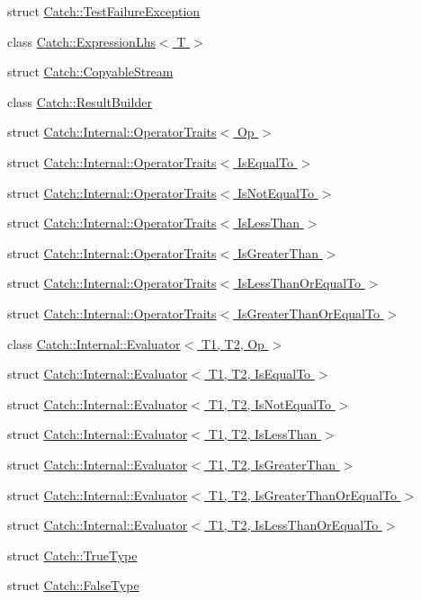 \begin{DoxyCompactItemize}
\item 
struct \hyperlink{a00087}{Catch\+::\+Test\+Failure\+Exception}
\item 
class \hyperlink{a00028}{Catch\+::\+Expression\+Lhs$<$ T $>$}
\item 
struct \hyperlink{a00014}{Catch\+::\+Copyable\+Stream}
\item 
class \hyperlink{a00067}{Catch\+::\+Result\+Builder}
\item 
struct \hyperlink{a00056}{Catch\+::\+Internal\+::\+Operator\+Traits$<$ Op $>$}
\item 
struct \hyperlink{a00057}{Catch\+::\+Internal\+::\+Operator\+Traits$<$ Is\+Equal\+To $>$}
\item 
struct \hyperlink{a00062}{Catch\+::\+Internal\+::\+Operator\+Traits$<$ Is\+Not\+Equal\+To $>$}
\item 
struct \hyperlink{a00060}{Catch\+::\+Internal\+::\+Operator\+Traits$<$ Is\+Less\+Than $>$}
\item 
struct \hyperlink{a00058}{Catch\+::\+Internal\+::\+Operator\+Traits$<$ Is\+Greater\+Than $>$}
\item 
struct \hyperlink{a00061}{Catch\+::\+Internal\+::\+Operator\+Traits$<$ Is\+Less\+Than\+Or\+Equal\+To $>$}
\item 
struct \hyperlink{a00059}{Catch\+::\+Internal\+::\+Operator\+Traits$<$ Is\+Greater\+Than\+Or\+Equal\+To $>$}
\item 
class \hyperlink{a00018}{Catch\+::\+Internal\+::\+Evaluator$<$ T1, T2, Op $>$}
\item 
struct \hyperlink{a00019}{Catch\+::\+Internal\+::\+Evaluator$<$ T1, T2, Is\+Equal\+To $>$}
\item 
struct \hyperlink{a00024}{Catch\+::\+Internal\+::\+Evaluator$<$ T1, T2, Is\+Not\+Equal\+To $>$}
\item 
struct \hyperlink{a00022}{Catch\+::\+Internal\+::\+Evaluator$<$ T1, T2, Is\+Less\+Than $>$}
\item 
struct \hyperlink{a00020}{Catch\+::\+Internal\+::\+Evaluator$<$ T1, T2, Is\+Greater\+Than $>$}
\item 
struct \hyperlink{a00021}{Catch\+::\+Internal\+::\+Evaluator$<$ T1, T2, Is\+Greater\+Than\+Or\+Equal\+To $>$}
\item 
struct \hyperlink{a00023}{Catch\+::\+Internal\+::\+Evaluator$<$ T1, T2, Is\+Less\+Than\+Or\+Equal\+To $>$}
\item 
struct \hyperlink{a00090}{Catch\+::\+True\+Type}
\item 
struct \hyperlink{a00029}{Catch\+::\+False\+Type}

\end{DoxyCompactItemize}
